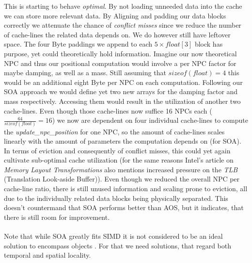 This is starting to behave \textit{optimal}. By not loading unneeded data into the cache we can store more relevant data. By Aligning and padding our data blocks correctly we attenuate the chance of \textit{conflict misses} since we reduce the number of cache-lines the related data depends on. We do however still have leftover space. The four Byte paddings we append to each $5\times float[3]$ block has purpose, yet could theoretically hold information. Imagine our now theoretical NPC and thus our positional computation would involve a per NPC factor for maybe damping, as well as a mass. Still assuming that $sizeof(float) = 4$ this would be an additional eight Byte per NPC on each computation. Following our SOA approach we would define yet two new arrays for the damping factor and mass respectively. Accessing them would result in the utilization of another two cache-lines. Even though those cache-lines now suffice 16 NPCs each ($\frac{64}{sizeof(float)} = 16$) we now are dependent on four individual cache-lines to compute the \textit{update\_npc\_position} for one NPC, so the amount of cache-lines scales linearly with the amount of parameters the computation depends on (for SOA). In terms of eviction and consequently of conflict misses, this could yet again cultivate sub-optimal cache utilization (for the same reasons Intel's article on \textit{Memory Layout Transformations}  also mentions increased pressure on the \textit{TLB} (Translation Look-aside Buffer)). Even though we reduced the overall NPC per cache-line ratio, there is still unused information and scaling prone to eviction, all due to the individually related data blocks being physically separated. This doesn't countermand that SOA performs better than AOS, but it indicates, that there is still room for improvement.\\\\
Note that while SOA greatly fits SIMD it is not considered to be an ideal solution to encompass objects . For that we need solutions, that regard both temporal and spatial locality. 

